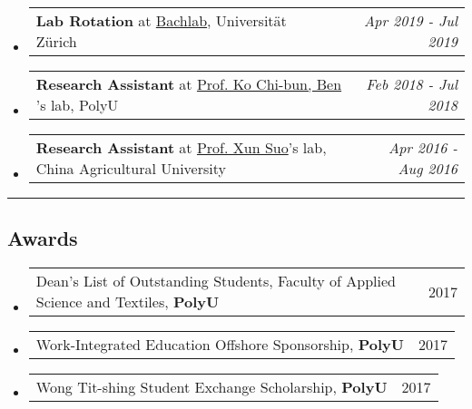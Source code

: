 \documentclass[10pt,a4paper]{article}
\makeatletter
\newcommand{\headerrow}[2]
{\begin{tabular*}{\linewidth}{l@{\extracolsep{\fill}}r}
	#1 &
	#2 \\
\end{tabular*}}
\newcommand{\urlKo}{https://www.polyu.edu.hk/en/abct/people/academic-staff/dr-ko-cb-ben/}
\newcommand{\urlSuo}{https://cvm.cau.edu.cn/art/2017/9/8/art_41955_48.html}
\newcommand{\Bachlab}{\href{http://bachlab.org/}{Bachlab}}
\newcommand{\CongiBench}{\href{https://github.com/fmelinscak/cognibench}{CongiBench}}
\newcommand{\SciUnit}{\href{https://github.com/scidash/sciunit}{SciUnit}}
\makeatother
\begin{document}
\begin{itemize}
	\item
	      \headerrow
	      {\textbf{Lab Rotation} at \Bachlab, Universität Zürich}
	      {\emph{Apr 2019 - Jul 2019}}

	\item
	      \headerrow
	      {\textbf{Research Assistant} at \href{\urlKo}{Prof. Ko Chi-bun, Ben}
		  's lab, PolyU}
	      {\emph{Feb 2018 - Jul 2018}}

	\item
	      \headerrow
	      {\textbf{Research Assistant} at \href{\urlSuo}{Prof. Xun Suo}'s lab,
		      China Agricultural University}
	      {\emph{Apr 2016 - Aug 2016}}

\end{itemize}



\hrule
\vspace{-1em}
\subsection*{Awards}

\begin{itemize}
	\parskip=0.1em
	\item
	      \headerrow
	      {Dean’s List of Outstanding Students, Faculty of Applied Science and
		      Textiles, \textbf{PolyU}}
	      {2017}

	\item
	      \headerrow
	      {Work-Integrated Education Offshore Sponsorship, \textbf{PolyU}}
	      {2017}

	\item
	      \headerrow
	      {Wong Tit-shing Student Exchange Scholarship, \textbf{PolyU}}
	      {2017}

\end{itemize}
\end{document}
